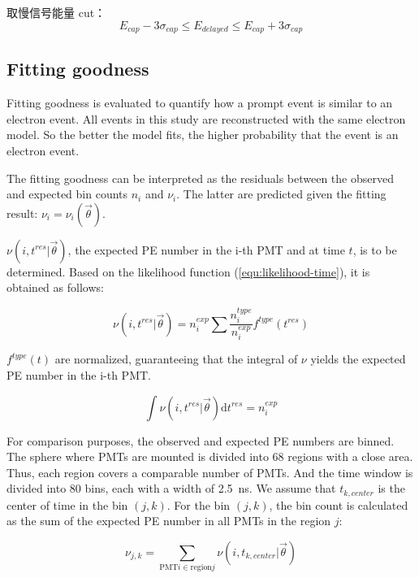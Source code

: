 \documentclass[12pt]{article}
\begin{document}
取慢信号能量 cut：
\begin{equation}
    E_{cap} - 3\sigma_{cap} \le E_{delayed} \le E_{cap} + 3\sigma_{cap}
\end{equation}
\subsection{Fitting goodness}

Fitting goodness is evaluated to quantify how a prompt event is similar to an electron event. All events in this study are reconstructed with the same electron model. So the better the model fits, the higher probability that the event is an electron event.

The fitting goodness can be interpreted as the residuals between the observed and expected bin counts $n_i$ and $\nu_i$. The latter are predicted given the fitting result: $\nu_i = \nu_i(\vec{\theta})$.

$\nu(i, t^{res} | \vec{\theta})$, the expected PE number in the i-th PMT and at time $t$, is to be determined. Based on the likelihood function (\ref{equ:likelihood-time}), it is obtained as follows:

\begin{equation}
  \nu(i, t^{res} | \vec{\theta}) = n_i^{exp} \sum{\frac{n_i^{type}}{n_i^{exp}} f^{type} (t^{res})}  
\end{equation}

$f^{type} (t)$ are normalized, guaranteeing that the integral of $\nu$ yields the expected PE number in the i-th PMT.

\begin{equation}
  \int{\nu(i, t^{res} | \vec{\theta}) \mathrm{d} t^{res}} = n_i^{exp}  
\end{equation}

For comparison purposes, the observed and expected PE numbers are binned. The sphere where PMTs are mounted is divided into 68 regions with a close area. Thus, each region covers a comparable number of PMTs. And the time window is divided into 80 bins, each with a width of \SI{2.5}{\nano\second}. We assume that $t_{k, center}$ is the center of time in the bin $(j, k)$. For the bin $(j, k)$, the bin count is calculated as the sum of the expected PE number in all PMTs in the region $j$:

\begin{equation}
    \nu_{j, k} = \sum_{\mathrm{PMT} i \in \mathrm{region} j} \nu(i, t_{k, center}|\vec{\theta})
\end{equation}
\end{document}
